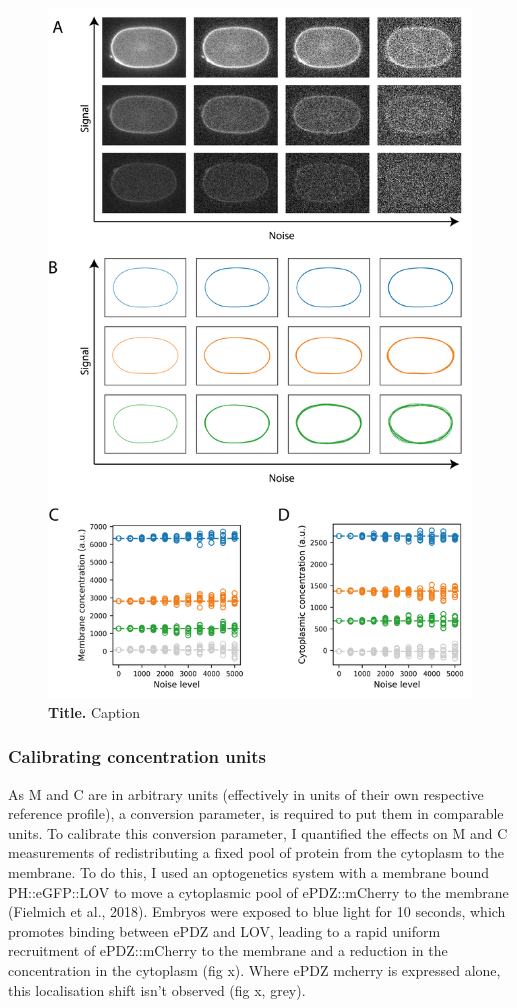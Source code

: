 \documentclass[12pt]{"article"}
\newcommand{\mycaption}[2]{\caption[#1]{\textbf{#1.} #2}}
\begin{document}
\begin{figure}[!h]
\includegraphics[scale=0.85]{memquant_benchmarking_noise}
\setlength{\abovecaptionskip}{20pt}
\centering
\mycaption{Title}{Caption}
\end{figure}


\subsubsection{Calibrating concentration units}

As M and C are in arbitrary units (effectively in units of their own respective reference profile), a conversion parameter, is required to put them in comparable units. To calibrate this conversion parameter, I quantified the effects on M and C measurements of redistributing a fixed pool of protein from the cytoplasm to the membrane. To do this, I used an optogenetics system with a membrane bound PH::eGFP::LOV to move a cytoplasmic pool of ePDZ::mCherry to the membrane (Fielmich et al., 2018). Embryos were exposed to blue light for 10 seconds, which promotes binding between ePDZ and LOV, leading to a rapid uniform recruitment of ePDZ::mCherry to the membrane and a reduction in the concentration in the cytoplasm (fig x). Where ePDZ mcherry is expressed alone, this localisation shift isn’t observed (fig x, grey).\\
\end{document}
